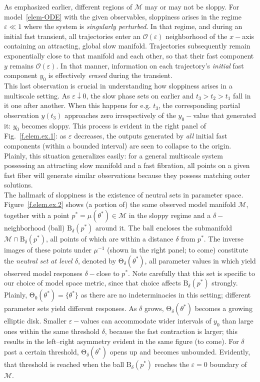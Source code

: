 \documentclass{article}
\newcommand{\eps}{\varepsilon}
\newcommand{\p}{\theta}
\newcommand{\omr}{\mu}
\newcommand{\omm}{\mathcal{M}}
\newcommand{\ps}{\mathrm{\Theta}}
\newcommand{\Ord}{\mathcal{O}}
\begin{document}
As emphasized earlier, different regions of $\omm$ may or may not be sloppy.
For model~\eqref{elem-ODE} with the given observables, sloppiness arises in the regime $\eps \ll 1$ where the system is \emph{singularly perturbed}.
In that regime, and during an initial fast transient, all trajectories enter an $\Ord(\eps)$ neighborhood of the $x-$axis containing an attracting, global slow manifold.
Trajectories subsequently remain exponentially close to that manifold and each other, so that their fast component $y$ remains $\Ord(\eps)$.
In that manner, information on each trajectory's \emph{initial} fast component $y_0$ is effectively \emph{erased} during the transient.\\

This last observation is crucial in understanding how sloppiness arises in a multiscale setting.
As $\eps \downarrow 0$, the slow phase sets on earlier and $t_3 > t_2 > t_1$ fall in it one after another.
When this happens for e.g. $t_3$, the corresponding partial observation $y(t_3)$ approaches zero irrespectively of the $y_0-$value that generated it: $y_0$ becomes sloppy.
This process is evident in the right panel of Fig.~\ref{f.elem.ex.1}: as $\eps$ decreases, the outputs generated by \emph{all} initial fast components (within a bounded interval) are seen to collapse to the origin.
Plainly, this situation generalizes easily: for a general multiscale system possessing an attracting slow manifold and a fast fibration, all points on a given fast fiber will generate similar observations because they possess matching outer solutions.\\

The hallmark of sloppiness is the existence of neutral sets in parameter space.
Figure~\ref{f.elem.ex.2} shows (a portion of) the same observed model manifold $\omm$, together with a point $p^* = \omr(\p^*) \in \omm$ in the sloppy regime and a $\delta-$neighborhood (ball) $\mathrm{B}_\delta(p^*)$ around it.
The ball encloses the submanifold $\omm \cap \mathrm{B}_\delta(p^*)$, all points of which are within a distance $\delta$ from $p^*$.
The inverse images of these points under $\omr^{-1}$ (shown in the right panel; to come) constitute the \emph{neutral set at level $\delta$}, denoted by $\ps_\delta(\p^*)$, all parameter values in which yield observed model responses $\delta-$close to $p^*$.
Note carefully that this set is specific to our choice of model space metric, since that choice affects $\mathrm{B}_\delta(p^*)$ strongly.
Plainly, $\ps_0(\p^*) = \{\p^*\}$ as there are no indeterminacies in this setting; different parameter sets yield different responses.
As $\delta$ grows, $\ps_\delta(\p^*)$ becomes a growing elliptic disk.
Smaller $\eps-$values can accommodate wider intervals of $y_0$ than large ones within the same threshold $\delta$, because the fast contraction is larger; this results in the left--right asymmetry evident in the same figure (to come).
For $\delta$ past a certain threshold, $\ps_\delta(\p^*)$ opens up and becomes unbounded.
Evidently, that threshold is reached when the ball $\mathrm{B}_\delta(p^*)$ reaches the $\eps=0$ boundary of $\omm$.\\
\end{document}
